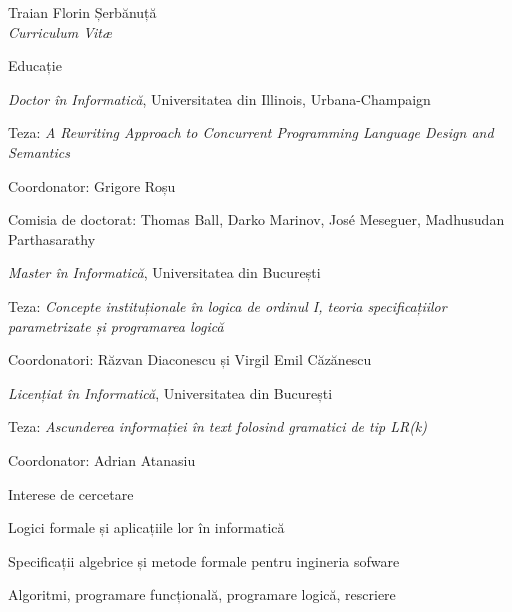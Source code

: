 \documentclass[10pt, romanian]{article}
\newenvironment{sublist}{%
    \begin{list}{}{%
        \setlength{\itemsep}{0em}\setlength{\parsep}{0em}%
        \setlength{\topsep}{0em}\setlength{\parskip}{0em}%
    }%
}%
{ \end{list} }
\begin{document}
\begin{cv}{Traian Florin Șerbănuță\\{\large \itshape Curriculum Vit\ae}}
\begin{cvlist}{Educație}
   \setlength{\itemsep}{-1ex}
    \item[2010] \emph{Doctor în Informatică},
    Universitatea din Illinois, Urbana-Champaign
        \item Teza: \textit{A Rewriting Approach to Concurrent Programming Language Design and Semantics}
        \item Coordonator: Grigore Roșu
        \item Comisia de doctorat: Thomas Ball, Darko Marinov, Jos\'e Meseguer,  Madhusudan Parthasarathy
   \setlength{\itemsep}{0ex}
    \item[2004] \emph{Master în Informatică},
    Universitatea din București
   \setlength{\itemsep}{-1ex}
        \item Teza: \textit{Concepte instituționale în logica de ordinul I, teoria specificațiilor parametrizate și programarea logică}
        \item Coordonatori: Răzvan Diaconescu și Virgil Emil Căzănescu
   \setlength{\itemsep}{0ex}
    \item[2002] \emph{Licențiat în Informatică},
    Universitatea din București
   \setlength{\itemsep}{-1ex}
        \item Teza: \textit{Ascunderea informației în text folosind gramatici de tip LR(k)}
        \item Coordonator: Adrian Atanasiu
\end{cvlist}


 {
\setlength{\cvlabelwidth}{1em}
\begin{cvlist}{Interese de cercetare}
\item Logici formale și aplicațiile lor în informatică
\item Specificații algebrice și metode formale pentru ingineria sofware
\item Algoritmi, programare funcțională, programare logică, rescriere
\end{cvlist}
\setlength{\cvlabelwidth}{\oldcvlabelwidth}
} {
}


\end{cv}
\end{document}

